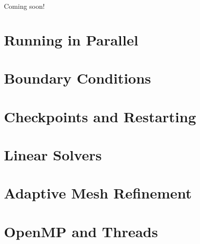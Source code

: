 Coming soon!

\section{Running in Parallel}

\section{Boundary Conditions}

\section{Checkpoints and Restarting}

\section{Linear Solvers}

\section{Adaptive Mesh Refinement}

\section{OpenMP and Threads}
